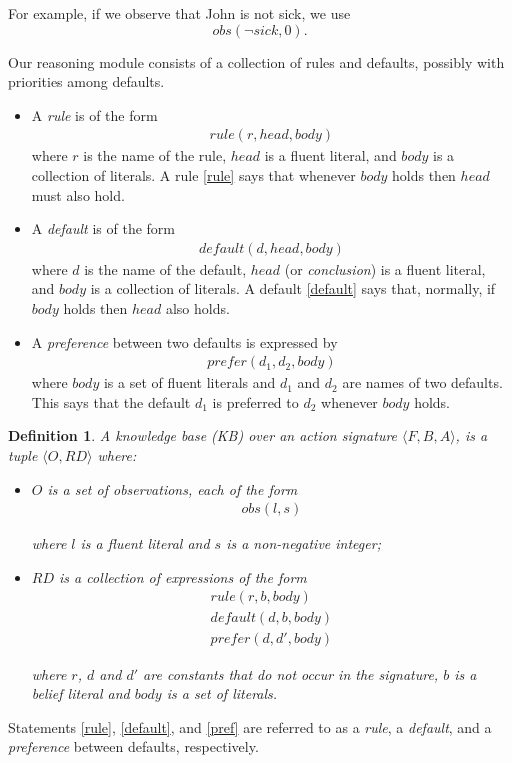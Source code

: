 \documentclass{article}
\newtheorem{definition}{Definition}
\begin{document}
For example, if we observe that John is not sick, we use 
\[
obs(\neg sick, 0). 
\]


Our reasoning module consists of a collection of rules and defaults, possibly with priorities among defaults. 
\begin{itemize} 
\item A \emph{rule} is of the form 
\begin{align}\label{rule}
rule(r, head, body)
\end{align} 
where $r$ is the name of the rule, $head$ is a fluent literal, and $body$ is a collection of literals. A rule \eqref{rule} says that whenever $body$ holds then $head$ must also hold. 
\item A \emph{default} is of the form 
\begin{align}\label{default}
default(d, head, body)
\end{align} 
where $d$ is the name of the default, $head$ (or \emph{conclusion}) is a fluent literal, and $body$ is a collection of literals.  A default \eqref{default} says that, normally, if $body$ holds then $head$ also holds. 
\item A \emph{preference} between two defaults is expressed by 
\begin{align}\label{pref}
prefer(d_1, d_2, body)
\end{align} 
where $body$ is a set of fluent literals and $d_1$ and $d_2$ are names of two defaults. This says that 
the default $d_1$ is  preferred to $d_2$ whenever $body$ holds.

\end{itemize} 

\fi

\begin{definition} 
A \emph{knowledge base (KB)} over an action signature  $\langle F,B,A \rangle$, 
is a tuple $\langle  O, RD \rangle$ where: 
\begin{itemize} 
\item $O$ is a set of observations, each of the form 
%
\begin{align}\label{obs}
obs(l,  s)  
\end{align} 

 
where $l$ is a fluent literal and $s$ is a non-negative integer; 
\item $RD$ is a collection of expressions of the form 
%
\begin{align}
rule(r, b, body)\label{rule} \\
default(d, b, body) \label{default} \\
prefer(d, d', body) \label{pref}
\end{align} 

where $r$, $d$ and $d'$ are constants that do not occur in the signature, 
$b$ is a belief literal and $body$ is a set of literals.  
\end{itemize}  
\end{definition} 
Statements \eqref{rule}, \eqref{default}, and \eqref{pref} are referred to as a 
 \emph{rule}, a \emph{default}, and a 
 \emph{preference} between defaults, respectively. 
\end{document}
